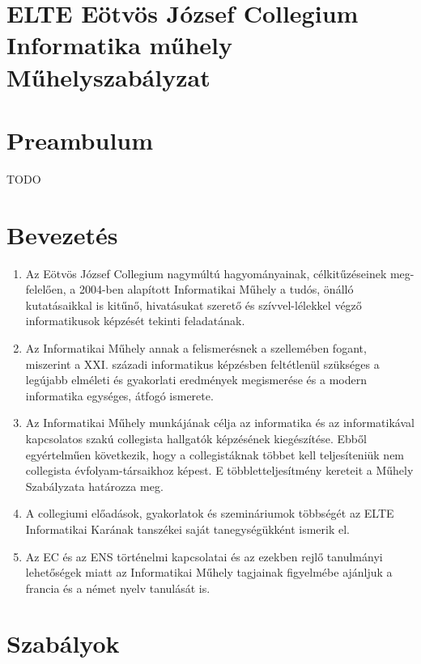 \documentclass{rulebook}
\begin{document}
\section*{ELTE Eötvös József Collegium \\ Informatika műhely\\ \vspace{0.5em} Műhelyszabályzat} 

\vspace{2em}

\section*{Preambulum}
TODO


\section{Bevezetés}

\begin{enumerate}
	\item Az Eötvös József Collegium nagymúltú hagyományainak, célkitűzéseinek meg-felelően, a 2004-ben alapított Informatikai Műhely a tudós, önálló kutatásaikkal is kitűnő, hivatásukat szerető és szívvel-lélekkel végző informatikusok képzését tekinti feladatának.
	\item Az Informatikai Műhely annak a felismerésnek a szellemében fogant, miszerint a XXI. századi informatikus képzésben feltétlenül szükséges a legújabb elméleti és gyakorlati eredmények megismerése és a modern informatika egységes, átfogó ismerete.
	\item Az Informatikai Műhely munkájának célja az informatika és az informatikával kapcsolatos szakú collegista hallgatók képzésének kiegészítése. Ebből egyértelműen következik, hogy a collegistáknak többet kell teljesíteniük nem collegista évfolyam-társaikhoz képest. E többletteljesítmény kereteit a Műhely Szabályzata határozza meg.
	\item A collegiumi előadások, gyakorlatok és szemináriumok többségét az ELTE Informatikai Karának tanszékei saját tanegységükként ismerik el.
	\item Az EC és az ENS történelmi kapcsolatai és az ezekben rejlő tanulmányi lehetőségek miatt az Informatikai Műhely tagjainak figyelmébe ajánljuk a francia és a német nyelv tanulását is.
\end{enumerate}


\section{Szabályok}
\end{document}

